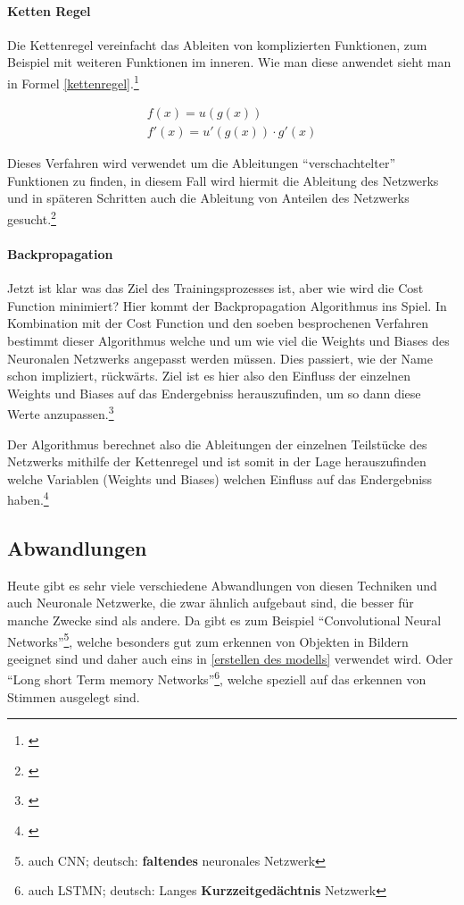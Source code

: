 \paragraph{Ketten Regel}\label{parachain}

Die Kettenregel vereinfacht das Ableiten von komplizierten Funktionen, zum Beispiel mit weiteren Funktionen im inneren. Wie man diese anwendet sieht man in Formel \ref{kettenregel}.\footnote{\cite{kettenregel}}

\begin{equation}\label{kettenregel}
    \begin{matrix}
        f(x) = u(g(x)) \\
        f'(x) = u'(g(x)) \cdot g'(x)
    \end{matrix}
\end{equation}

Dieses Verfahren wird verwendet um die Ableitungen "`verschachtelter"' Funktionen zu finden, in diesem Fall wird hiermit die Ableitung des Netzwerks und in späteren Schritten auch die Ableitung von Anteilen des Netzwerks gesucht.\footnote{\cite{chainruleml}}

\paragraph{Backpropagation}\label{backprop}

Jetzt ist klar was das Ziel des Trainingsprozesses ist, aber wie wird die Cost Function minimiert? Hier kommt der Backpropagation Algorithmus ins Spiel. In Kombination mit der Cost Function und den soeben besprochenen Verfahren bestimmt dieser Algorithmus welche und um wie viel die Weights und Biases des Neuronalen Netzwerks angepasst werden müssen. Dies passiert, wie der Name schon impliziert, rückwärts. Ziel ist es hier also den Einfluss der einzelnen Weights und Biases auf das Endergebniss herauszufinden, um so dann diese Werte anzupassen.\footnote{\cite{3blue1brown}}

Der Algorithmus berechnet also die Ableitungen der einzelnen Teilstücke des Netzwerks mithilfe der Kettenregel und ist somit in der Lage herauszufinden welche Variablen (Weights und Biases) welchen Einfluss auf das Endergebniss haben.\footnote{\cite{3blue1brown}}

\subsection{Abwandlungen}

Heute gibt es sehr viele verschiedene Abwandlungen von diesen Techniken und auch Neuronale Netzwerke, die zwar ähnlich aufgebaut sind, die besser für manche Zwecke sind als andere. Da gibt es zum Beispiel "`Convolutional Neural Networks"'\footnote{auch CNN; deutsch: \textbf{faltendes} neuronales Netzwerk}, welche besonders gut zum erkennen von Objekten in Bildern geeignet sind und daher auch eins in \ref{erstellen des modells} verwendet wird. Oder "`Long short Term memory Networks"'\footnote{auch LSTMN; deutsch: Langes \textbf{Kurzzeitgedächtnis} Netzwerk}, welche speziell auf das erkennen von Stimmen ausgelegt sind.

